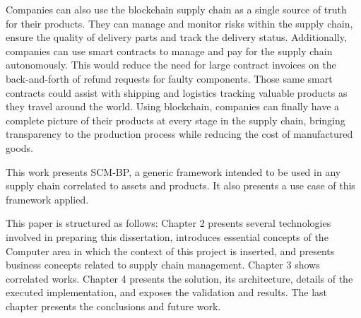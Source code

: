 Companies can also use the blockchain supply chain as a single source of truth for their products. They can manage and monitor risks within the supply chain, ensure the quality of delivery parts and track the delivery status. Additionally, companies can use smart contracts to manage and pay for the supply chain autonomously. This would reduce the need for large contract invoices on the back-and-forth of refund requests for faulty components. Those same smart contracts could assist with shipping and logistics tracking valuable products as they travel around the world. Using blockchain, companies can finally have a complete picture of their products at every stage in the supply chain, bringing transparency to the production process while reducing the cost of manufactured goods.

This work presents \acf{SCM-BP}, a generic framework intended to be used in any supply chain correlated to assets and products. It also presents a use case of this framework applied.

This paper is structured as follows: Chapter 2 presents several technologies involved in preparing this dissertation, introduces essential concepts of the Computer area in which the context of this project is inserted, and presents business concepts related to supply chain management. Chapter 3 shows correlated works. Chapter 4 presents the solution, its architecture, details of the executed implementation, and exposes the validation and results. The last chapter presents the conclusions and future work.